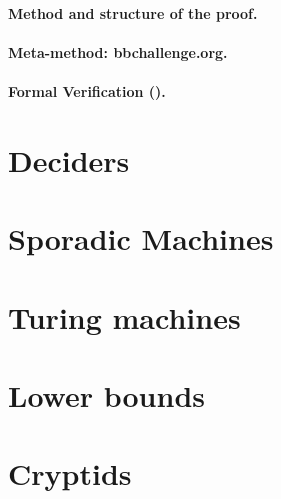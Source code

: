 \documentclass[a4paper,british]{article}
\theoremstyle{definition} %
\numberwithin{equation}{section}
\theoremstyle{definition} %
\begin{document}
\paragraph{Method and structure of the proof.}

\paragraph{Meta-method: bbchallenge.org.}

\paragraph{Formal Verification (\Coq).}

\section{Deciders}

% 
% 

% 
% 
% 

\section{Sporadic Machines}





\newpage


\appendix

\section{Turing machines}\label{app:TMs}
\section{Lower bounds}\label{app:lowerbounds}
\section{Cryptids}\label{app:cryptids}
\end{document}
